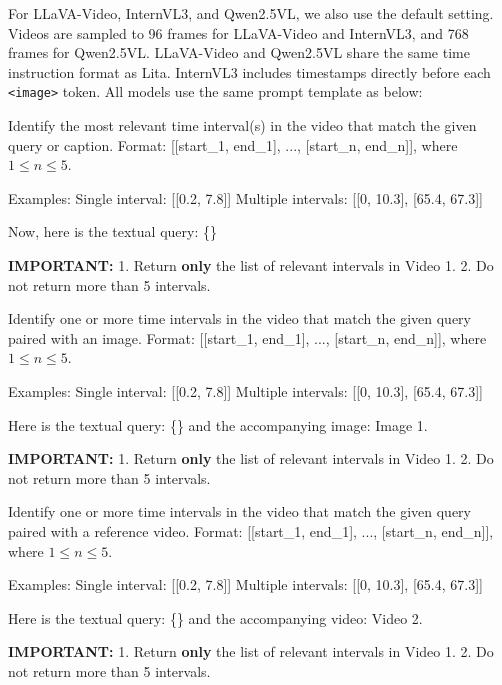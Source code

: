 \documentclass{article}
\begin{document}
For LLaVA-Video, InternVL3, and Qwen2.5VL, we also use the default setting. Videos are sampled to 96 frames for LLaVA-Video and InternVL3, and 768 frames for Qwen2.5VL. LLaVA-Video and Qwen2.5VL share the same time instruction format as Lita. InternVL3 includes timestamps directly before each \texttt{<image>} token. All models use the same prompt template as below:

\begin{tcolorbox}[promptstyle, title={\texttt{LLaVA-Video / InternVL3 / Qwen2.5VL: TMR Task}}]
Identify the most relevant time interval(s) in the video that match the given query or caption.  
Format: [[start\_1, end\_1], ..., [start\_n, end\_n]], where $1 \leq n \leq 5$.

Examples:  
Single interval: [[0.2, 7.8]]  
Multiple intervals: [[0, 10.3], [65.4, 67.3]]

Now, here is the textual query: \{\}

\textbf{IMPORTANT:}  
1. Return \textbf{only} the list of relevant intervals in Video 1.  
2. Do not return more than 5 intervals.
\end{tcolorbox}

\begin{tcolorbox}[promptstyle, title={\texttt{LLaVA-Video / InternVL3 / Qwen2.5VL: IMR Task}}]
Identify one or more time intervals in the video that match the given query paired with an image.  
Format: [[start\_1, end\_1], ..., [start\_n, end\_n]], where $1 \leq n \leq 5$.

Examples:  
Single interval: [[0.2, 7.8]]  
Multiple intervals: [[0, 10.3], [65.4, 67.3]]

Here is the textual query: \{\} and the accompanying image: Image 1.

\textbf{IMPORTANT:}  
1. Return \textbf{only} the list of relevant intervals in Video 1.  
2. Do not return more than 5 intervals.
\end{tcolorbox}

\begin{tcolorbox}[promptstyle, title={\texttt{LLaVA-Video / InternVL3 / Qwen2.5VL: VMR Task}}]
Identify one or more time intervals in the video that match the given query paired with a reference video.  
Format: [[start\_1, end\_1], ..., [start\_n, end\_n]], where $1 \leq n \leq 5$.

Examples:  
Single interval: [[0.2, 7.8]]  
Multiple intervals: [[0, 10.3], [65.4, 67.3]]

Here is the textual query: \{\} and the accompanying video: Video 2.

\textbf{IMPORTANT:}  
1. Return \textbf{only} the list of relevant intervals in Video 1.  
2. Do not return more than 5 intervals.
\end{tcolorbox}
\end{document}
